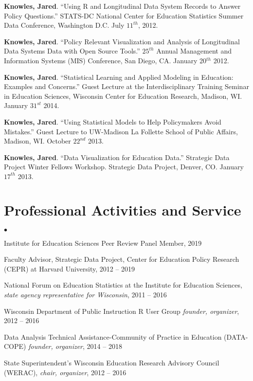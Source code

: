 \documentclass[margin,line]{res}
\newenvironment{list2}{
  \begin{list}{$\bullet$}{%
      \setlength{\itemsep}{0in}
      \setlength{\parsep}{0in} \setlength{\parskip}{0in}
      \setlength{\topsep}{0in} \setlength{\partopsep}{0in} 
      \setlength{\leftmargin}{0.2in}}}{\end{list}}
\begin{document}
\begin{resume}
\textbf{Knowles, Jared}. ``Using R and Longitudinal Data System Records to Answer Policy Questions.'' STATS-DC National Center for Education Statistics Summer Data Conference, Washington D.C. July $11^{th}$, 2012.


\textbf{Knowles, Jared}. ``Policy Relevant Visualization and Analysis of Longitudinal Data Systems Data with Open Source Tools.'' $25^{th}$ Annual Management and Information Systems (MIS) Conference, San Diego, CA. January 20$^{th}$ 2012.

\textbf{Knowles, Jared}. ``Statistical Learning and Applied Modeling in Education: Examples 
and Concerns.'' Guest Lecture at the Interdisciplinary Training Seminar in Education Sciences, Wisconsin Center for Education Research, Madison, WI. January $31^{st}$ 2014.


\textbf{Knowles, Jared}. ``Using Statistical Models to Help Policymakers Avoid Mistakes.'' Guest Lecture to UW-Madison La Follette School of Public Affairs, Madison, WI. October $22^{nd}$ 2013.

\textbf{Knowles, Jared}. ``Data Visualization for Education Data.'' Strategic Data Project Winter Fellows Workshop. Strategic Data Project, Denver, CO. January $17^{th}$ 2013. 



\section{\sc Professional Activities and Service}
% 
\begin{list2}
\item Institute for Education Sciences Peer Review Panel Member, 2019
\item Faculty Advisor, Strategic Data Project, Center for Education Policy Research (CEPR) at Harvard University, 2012 -- 2019
\item National Forum on Education Statistics at the Institute for Education Sciences, \emph{state agency representative for Wisconsin}, 2011 -- 2016
\item Wisconsin Department of Public Instruction R User Group \emph{founder, organizer}, 
2012 -- 2016 
\item Data Analysis Technical Assistance-Community of Practice in Education 
(DATA-COPE) \emph{founder, organizer}, 2014 -- 2018
\item State Superintendent's Wisconsin Education Research Advisory Council (WERAC), 
\emph{chair, organizer}, 2012 -- 2016
\end{list2}


\end{resume}
\end{document}
